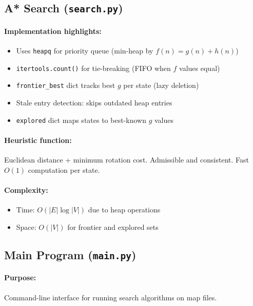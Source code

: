 \documentclass[11pt,a4paper]{article}
\begin{document}
\subsection{A* Search (\texttt{search.py})}

\paragraph{Implementation highlights:}
\begin{itemize}[leftmargin=1.5cm,itemsep=0.1em]
    \item Uses \texttt{heapq} for priority queue (min-heap by $f(n) = g(n) + h(n)$)
    \item \texttt{itertools.count()} for tie-breaking (FIFO when $f$ values equal)
    \item \texttt{frontier\_best} dict tracks best $g$ per state (lazy deletion)
    \item Stale entry detection: skips outdated heap entries
    \item \texttt{explored} dict maps states to best-known $g$ values
\end{itemize}

\paragraph{Heuristic function:}
Euclidean distance + minimum rotation cost. Admissible and consistent. Fast $O(1)$ computation per state.

\paragraph{Complexity:}
\begin{itemize}[leftmargin=1.5cm,itemsep=0.1em]
    \item Time: $O(|E| \log |V|)$ due to heap operations
    \item Space: $O(|V|)$ for frontier and explored sets
\end{itemize}

\subsection{Main Program (\texttt{main.py})}

\paragraph{Purpose:} Command-line interface for running search algorithms on map files.
\end{document}
